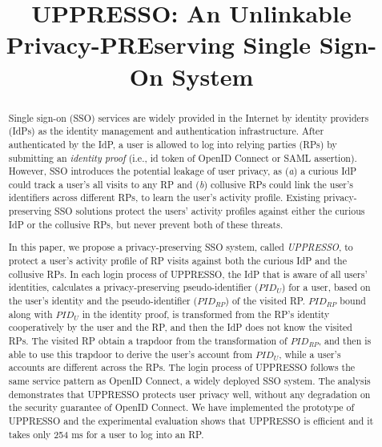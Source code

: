 \documentclass[conference, 10pt]{IEEEtran}
\begin{document}
\title{{UPPRESSO}: An Unlinkable Privacy-PREserving Single Sign-On System}
\maketitle
\begin{abstract}
Single sign-on (SSO) services
     are widely provided in the Internet by identity providers (IdPs) as the identity management
      and authentication infrastructure.
After authenticated by the IdP,
    a user is allowed to log into relying parties (RPs) by submitting an \emph{identity proof}
    (i.e., id token of OpenID Connect or SAML assertion).
However,
    SSO introduces the potential leakage of user privacy,
        as (\emph{a}) a curious IdP could track a user's all visits to any RP
            and (\emph{b}) collusive RPs could link the user's identifiers across different RPs,
            to learn the user's activity profile.
Existing privacy-preserving SSO solutions protect the users' activity profiles
    against either the curious IdP or the collusive RPs, but never prevent both of these threats.

In this paper, we propose a privacy-preserving SSO system, called \emph{UPPRESSO},
     to protect a user's activity profile of RP visits
        against both the curious IdP and the collusive RPs.
In each login process of UPPRESSO,
 the IdP that is aware of all users' identities,
         calculates a privacy-preserving pseudo-identifier ($PID_U$) for a user,
    based on the user's identity and the pseudo-identifier ($PID_{RP}$) of the visited RP.
$PID_{RP}$ bound along with $PID_U$ in the identity proof,
   is transformed from the RP's identity cooperatively by the user and the RP,
    and then the IdP does not know the visited RPs.
The visited RP obtain a trapdoor from the transformation of $PID_{RP}$,
    and then is able to use this trapdoor to derive the user's account from $PID_U$,
 while a user's accounts are different across the RPs.
The login process of UPPRESSO follows the same service pattern as OpenID Connect, a widely deployed SSO system.
The analysis demonstrates that UPPRESSO protects user privacy well, without any degradation on the security guarantee of OpenID Connect.
We have implemented the prototype of UPPRESSO and
 the experimental evaluation shows that UPPRESSO is efficient and
  it takes only 254 ms for a user to log into an RP.
\end{abstract}
\end{document}
